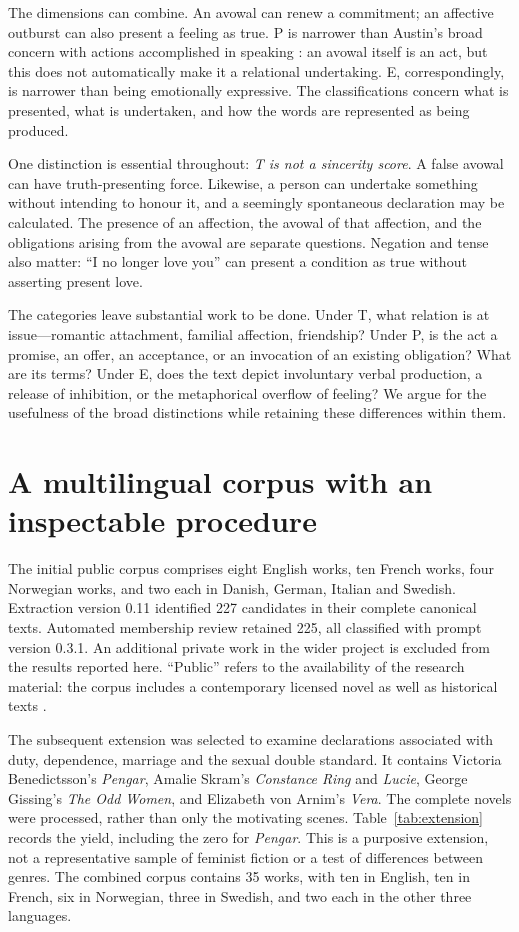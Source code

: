 \documentclass[11pt,a4paper]{article}
\begin{document}
The dimensions can combine. An avowal can renew a commitment; an affective outburst can also present a feeling as true. P is narrower than Austin's broad concern with actions accomplished in speaking \citep{austin1975}: an avowal itself is an act, but this does not automatically make it a relational undertaking. E, correspondingly, is narrower than being emotionally expressive. The classifications concern what is presented, what is undertaken, and how the words are represented as being produced.

One distinction is essential throughout: \emph{T is not a sincerity score}. A false avowal can have truth-presenting force. Likewise, a person can undertake something without intending to honour it, and a seemingly spontaneous declaration may be calculated. The presence of an affection, the avowal of that affection, and the obligations arising from the avowal are separate questions. Negation and tense also matter: “I no longer love you” can present a condition as true without asserting present love.

The categories leave substantial work to be done. Under T, what relation is at issue---romantic attachment, familial affection, friendship? Under P, is the act a promise, an offer, an acceptance, or an invocation of an existing obligation? What are its terms? Under E, does the text depict involuntary verbal production, a release of inhibition, or the metaphorical overflow of feeling? We argue for the usefulness of the broad distinctions while retaining these differences within them.

\section{A multilingual corpus with an inspectable procedure}

The initial public corpus comprises eight English works, ten French works, four Norwegian works, and two each in Danish, German, Italian and Swedish. Extraction version 0.11 identified 227 candidates in their complete canonical texts. Automated membership review retained 225, all classified with prompt version 0.3.1. An additional private work in the wider project is excluded from the results reported here. “Public” refers to the availability of the research material: the corpus includes a contemporary licensed novel as well as historical texts \citep{lmcw2026}.

The subsequent extension was selected to examine declarations associated with duty, dependence, marriage and the sexual double standard. It contains Victoria Benedictsson's \emph{Pengar}, Amalie Skram's \emph{Constance Ring} and \emph{Lucie}, George Gissing's \emph{The Odd Women}, and Elizabeth von Arnim's \emph{Vera}. The complete novels were processed, rather than only the motivating scenes. Table~\ref{tab:extension} records the yield, including the zero for \emph{Pengar}. This is a purposive extension, not a representative sample of feminist fiction or a test of differences between genres. The combined corpus contains 35 works, with ten in English, ten in French, six in Norwegian, three in Swedish, and two each in the other three languages.
\end{document}
